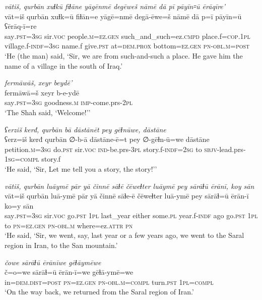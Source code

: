 \ea \label{ZQ.5}
\textit{vātiš, qurbān xuɫkū fiɫāne yāgēnmē degēweš nāmē dā pī pāyīn꞊ū ērāqīre'} \\ 
\gll vāt=iš qurbān xuɫk=ū fiɫān=e yāgē=nmē degā-ēwe=š nāmē dā p=ī pāyīn=ū ʕērāq-ī=re \\ 
 say\textsc{.pst}\textsc{=3sg} sir.\textsc{voc} people\textsc{.m}\textsc{=ez.gen} such\_and\_such=ez\textsc{.cmpd} place.f\textsc{=cop}\textsc{.\textsc{1pl}} village.f\textsc{-indf}\textsc{=3sg} name.f give\textsc{.pst} at=\textsc{dem.prox} bottom\textsc{=ez.gen} \textsc{pn}\textsc{-obl}\textsc{.m}\textsc{=\textsc{post}} \\ 
\glt `He (the man) said, ‘Sir, we are from such-and-such a place. He gave him the name of a village in the south of Iraq.'
\z 
 
\ea \label{ZQ.6}
\textit{fermāwāš, xeyr beydē’} \\ 
\gll fermāwā=š xeyr b-e-ydē \\ 
 say\textsc{.pst}\textsc{=3sg} goodness\textsc{.m} \textsc{imp-}come.prs-\textsc{2pl} \\ 
\glt `The Shah said, ‘Welcome!’'
\z 
 
\ea \label{ZQ.7}
\textit{ʕerziš kerđ, qurbān bā dāstānēt pey gēɫnūwe, dāstāne} \\ 
\gll ʕerz=iš kerđ qurbān ∅-b-ā dāstāne-ē=t pey ∅-gēɫn-ū=we dāstāne \\ 
 petition\textsc{.m}\textsc{=3sg} do\textsc{.pst} sir.\textsc{voc} \textsc{ind-}be.prs\textsc{-3pl} story.f\textsc{-indf}\textsc{=\textsc{2sg}} to \textsc{sbjv-}lead.prs\textsc{-\textsc{1sg}}\textsc{=compl} story.f \\ 
\glt `He said, ‘Sir, Let me tell you a story, the story!’'
\z 
 
\ea \label{ZQ.9}
\textit{vātiš, qurbān luāymē pār yā činnē sāɫē čēweɫter luāymē pey sārāɫū ērānī, koy sān} \\ 
\gll vāt=iš qurbān luā-ymē pār yā činnē sāɫe-ē čēweɫter luā-ymē pey sārāɫ=ū ērān-ī ko=y sān \\ 
 say\textsc{.pst}\textsc{=3sg} sir.\textsc{voc} go\textsc{.pst} \textsc{1pl} last\_year either some\textsc{.pl} year.f\textsc{-indf} ago go\textsc{.pst} \textsc{1pl} to \textsc{pn}\textsc{=ez.gen} \textsc{pn}\textsc{-obl}\textsc{.m} where=ez.\textsc{attr} \textsc{pn} \\ 
\glt `He said, ‘Sir, we went, say, last year or a few years ago, we went to the Saral region in Iran, to the San mountain.'
\z 
 
\ea \label{ZQ.10}
\textit{čowe sārāɫū ērānīwe gēɫāymēwe} \\ 
\gll č=o=we sārāɫ=ū ērān-ī=we gēɫā-ymē=we \\ 
 in=\textsc{dem.dist}\textsc{=\textsc{post}} \textsc{pn}\textsc{=ez.gen} \textsc{pn}\textsc{-obl}\textsc{.m}\textsc{=compl} turn\textsc{.pst} \textsc{1pl}\textsc{=compl} \\ 
\glt `On the way back, we returned from the Saral region of Iran.'
\z 
 

